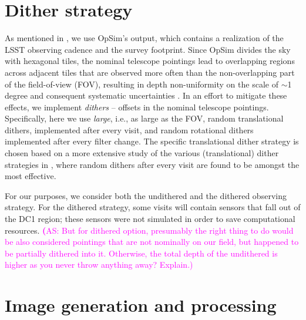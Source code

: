 \documentclass[twocolumn]{aastex62}
\newcommand{\as}[1]{{\textcolor{magenta}{{\textbf (AS: #1)}}}}
\begin{document}
\section{Dither strategy}
\label{sec:dithering}

As mentioned in , we use OpSim's output, which contains a realization of the LSST observing cadence and the survey footprint. Since OpSim divides the sky with hexagonal tiles, the nominal telescope pointings lead to overlapping regions across adjacent tiles that are observed more often than the non-overlapping part of the field-of-view (FOV), resulting in depth non-uniformity on the scale of $\sim$1 degree and consequent systematic uncertainties \citep{2016ApJ...829...50A}. In an effort to mitigate these effects, we implement \textit{dithers} -- offsets in the nominal telescope pointings. Specifically, here we use \textit{large}, i.e., as large as the FOV, random translational dithers, implemented after every visit, and random rotational dithers implemented after every filter change. The specific translational dither strategy is chosen based on a more extensive study of the various (translational) dither strategies in \citet{2016ApJ...829...50A}, where random dithers after every visit are found to be amongst the most effective.

For our purposes, we consider both the undithered and the dithered observing strategy. For the dithered strategy, some visits will contain sensors that fall out of the DC1 region; these sensors were not simulated in order to save computational resources.
\as{But for dithered option, presumably the right thing to do would be also considered pointings that are not nominally on our field, but happened to be partially dithered into it. Otherwise, the total depth of the undithered is higher as you never throw anything away? Explain.}



\section{Image generation and processing}
\label{sec:image_generation_pipeline}
\end{document}
